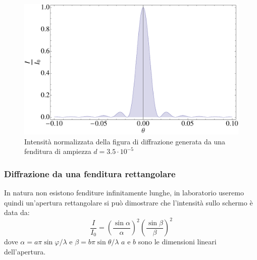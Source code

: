 \documentclass[a4paper,10pt,oneside]{article}
\begin{document}
\begin{figure}[H]
 \centering
 \includegraphics[width=\textwidth]{./Immagini/diffrazione2.pdf}
 \caption{Intensità normalizzata della figura di diffrazione generata da una fenditura di ampiezza $d=3.5\cdot 10^{-5}$}
 \label{fig:diffrazione_slit}
\end{figure}

\subsubsection*{Diffrazione da una fenditura rettangolare}
In natura non esistono fenditure infinitamente lunghe, in laboratorio useremo quindi un'apertura rettangolare si può dimostrare che l'intensità sullo schermo è data da:
\begin{equation}
 \frac{I}{I_0}=\left(\frac{\sin\alpha}{\alpha}\right)^2\left(\frac{\sin\beta}{\beta}\right)^2
\end{equation}
dove $\alpha=a\pi\sin\varphi/\lambda$ e $\beta=b\pi\sin\theta/\lambda$ $a$ e $b$ sono le dimensioni lineari dell'apertura.
\end{document}
